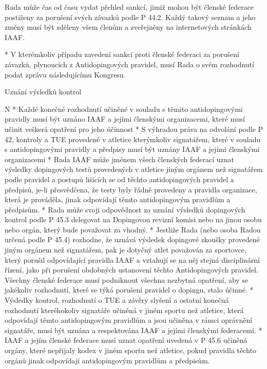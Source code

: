 Rada může čas od času vydat přehled sankcí, jimiž mohou být členské federace postiženy za porušení svých závazků podle P 44.2. Každý takový seznam a jeho změny musí být sděleny všem členům a zveřejněny na internetových stránkách IAAF.

* V kterémkoliv případu zavedení sankcí proti členské federaci za porušení závazků, plynoucích z Antidopingových pravidel, musí Rada o svém rozhodnutí podat zprávu následujícímu Kongresu.
\enditems

\secc Uznání výsledků kontrol

\begitems \style N
* Každé konečné rozhodnutí učiněné v souladu s těmito antidopingovými pravidly musí být uznáno IAAF a jejími členskými organizacemi, které musí učinit veškerá opatření pro jeho účinnost
* S výhradou práva na odvolání podle P 42, kontroly a TUE provedené v atletice kterýmkoliv signatářem, které v souladu s antidopingovými pravidly a předpisy musí být uznány IAAF a jejími členskými organizacemi
* Rada IAAF může jménem všech členských federací uznat výsledky dopingových testů provedených v atletice jiným orgánem než signatářem podle pravidel a postupů lišících se od těchto antidopingových pravidel a předpisů, je-li přesvědčena, že testy byly řádně provedeny a pravidla organizace, která je prováděla, jinak odpovídají těmto antidopingovým pravidlům a předpisům.
* Rada může svoji odpovědnost za uznání výsledků dopingových kontrol podle P 45.3 delegovat na Dopingovou revizní komisi nebo na jinou osobu nebo orgán, který bude považovat za vhodný.
* Jestliže Rada (nebo osoba Radou určená podle P 45.4) rozhodne, že uznává výsledek dopingové zkoušky provedené jiným orgánem než signatářem, pak je dotyčný atlet považován za sportovce, který porušil odpovídající pravidla IAAF a vztahují se na něj stejná disciplinární řízení, jako při porušení obdobných ustanovení těchto Antidopingových pravidel. Všechny členské federace musí podniknout všechna nezbytná opatření, aby se jakékoliv rozhodnutí, které se týká porušení pravidel o dopingu, stalo účinné.
* Výsledky kontrol, rozhodnutí o TUE a závěry slyšení a ostatní konečná rozhodnutí kteréhokoliv signatáře učiněná v jiném sportu než atletice, která odpovídají těmto antidopingovým pravidlům a jsou učiněna v rámci oprávnění signatáře, musí být uznána a respektována IAAF a jejími členskými federacemi.
* IAAF a jejím členské federace musí uznat opatření uvedená v P 45.6 učiněná orgány, které nepřijaly kodex v jiném sportu než atletice, pokud pravidla těchto orgánů jinak odpovídají antidopingovým pravidlům a předpisům.
\enditems

